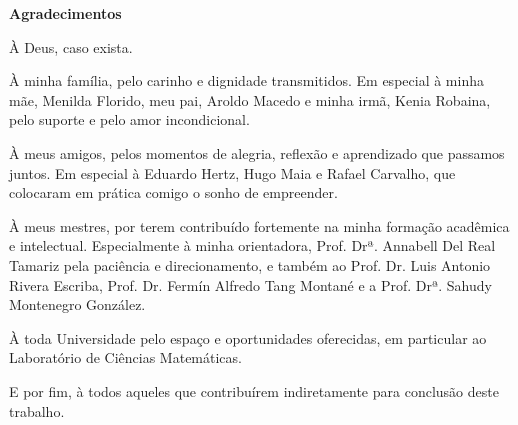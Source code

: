 \begin{center}
\textbf{Agradecimentos} \\ [2.5cm]
\end{center}

À Deus, caso exista.

À minha família, pelo carinho e dignidade transmitidos. Em
especial à minha mãe, Menilda Florido, meu pai, Aroldo Macedo e minha irmã,
Kenia Robaina, pelo suporte e pelo amor incondicional.

À meus amigos, pelos momentos de alegria, reflexão e
aprendizado que passamos juntos. Em especial à Eduardo Hertz, Hugo Maia e
Rafael Carvalho, que colocaram em prática comigo o sonho de empreender.

À meus mestres, por terem contribuído fortemente na minha formação acadêmica e
intelectual. Especialmente à minha orientadora, Prof. Drª. Annabell Del Real Tamariz
pela paciência e direcionamento, e também ao Prof. Dr. Luis Antonio Rivera Escriba,
Prof. Dr. Fermín Alfredo Tang Montané e a Prof. Drª. Sahudy Montenegro González.

À toda Universidade pelo espaço e oportunidades oferecidas, em particular ao Laboratório
de Ciências Matemáticas.

E por fim, à todos aqueles que contribuírem indiretamente para conclusão deste
trabalho.
